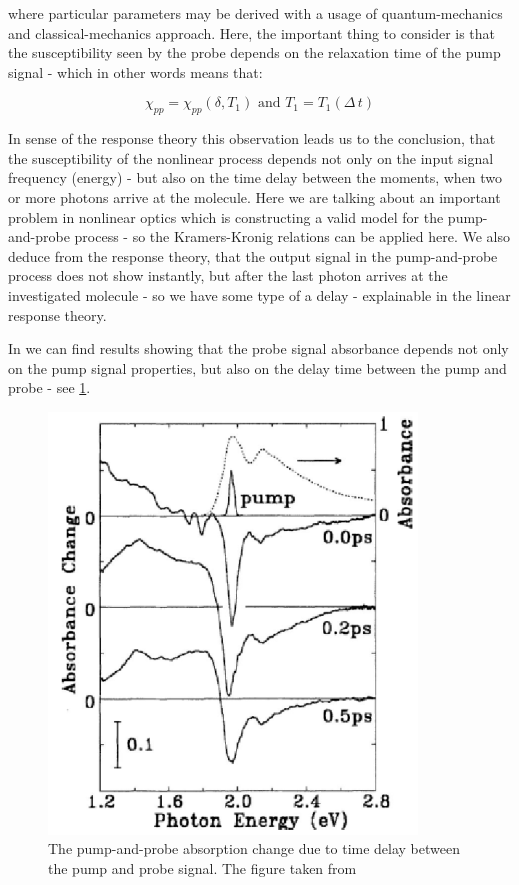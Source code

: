 \documentclass[12pt,twoside,a4paper]{article}
\numberwithin{equation}{subsection}
\numberwithin{figure}{subsection}
\begin{document}
where particular parameters may be derived with a usage of quantum-mechanics and classical-mechanics approach. Here,
the important thing to consider is that the susceptibility seen by the probe depends on the relaxation time of the pump signal -
which in other words means that:

\begin{equation} \label{pump_depend}
  \chi_{pp} = \chi_{pp}(\delta, T_{1}) \mbox{ and } T_{1} = T_{1}(\Delta \, t)
\end{equation}

In sense of the response theory this observation leads us to the conclusion, that the susceptibility of the nonlinear process depends not
only on the input signal frequency (energy) - but also on the time delay between the moments, when two or more photons arrive at
the molecule. Here we are talking about an important problem in nonlinear
optics which is constructing a valid model for the pump-and-probe process - so the Kramers-Kronig relations can be applied
here. We also deduce from the response theory, that the output signal in the pump-and-probe process does not show instantly, but after the last
photon arrives at the investigated molecule - so we have some type of a delay - explainable in the linear response
theory.

In \cite{christodoulides_nonlinear} we can find results showing that the probe signal absorbance depends not only on the pump
signal properties, but also on the delay time between the pump and probe - see \ref{fig:pnp_absorption}.

\begin{figure} 
  \includegraphics{img/pnp_abs.png}
  \caption{The pump-and-probe absorption change due to time delay between the pump and probe signal.
  The figure taken from \cite{christodoulides_nonlinear} \label{fig:pnp_absorption} }
\end{figure}
\end{document}
